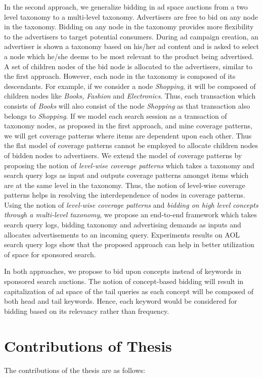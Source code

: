 In the second approach, we generalize bidding in ad space auctions from a two level taxonomy to a multi-level taxonomy. Advertisers are free to bid on any node in the taxonomy. Bidding on any node in the taxonomy provides more flexibility to the advertisers to target potential consumers. During ad campaign creation, an advertiser is shown a taxonomy based on his/her ad content and is asked to select a node which he/she deems to be most relevant to the product being advertised. A set of children nodes of the bid node is allocated to the advertisers, similar to the first approach. However, each node in the taxonomy is composed of its descendants. For example, if we consider a node \textit{Shopping}, it will be composed of children nodes like \textit{Books, Fashion} and \textit{Electronics}. Thus, each transaction which consists of \textit{Books} will also consist of the node \textit{Shopping} as that transaction also belongs to \textit{Shopping}. If we model each search session as a transaction of taxonomy nodes, as proposed in the first approach, and mine coverage patterns, we will get coverage patterns where items are dependent upon each other. Thus the flat model of coverage patterns cannot be employed to allocate children nodes of bidden nodes to advertisers. We extend the model of coverage patterns by proposing the notion of \textit{level-wise coverage patterns} which takes a taxonomy and search query logs as input and outputs coverage patterns amongst items which are at the same level in the taxonomy. Thus, the notion of level-wise coverage patterns helps in resolving the interdependence of nodes in coverage patterns. Using the notion of \textit{level-wise coverage patterns} and \textit{bidding on high level concepts through a multi-level taxonomy}, we propose an end-to-end framework which takes search query logs, bidding taxonomy and advertising demands as inputs and allocates advertisements to an incoming query. Experiments results on AOL search query logs show that the proposed approach can help in better utilization of space for sponsored search.


In both approaches, we propose to bid upon concepts instead of keywords in sponsored search auctions. The notion of concept-based bidding will result in capitalization of ad space of the tail queries as each concept will be composed of both head and tail keywords. Hence, each keyword would be considered for bidding based on its relevancy rather than frequency.


\section{Contributions of Thesis}
The contributions of the thesis are as follows:

